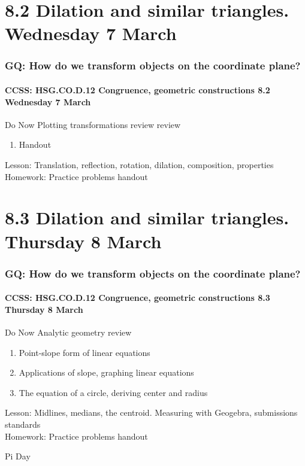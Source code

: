 \documentclass{beamer}
\begin{document}
\section{8.2 Dilation and similar triangles. Wednesday 7 March}
  \frame
  {
    \frametitle{GQ: How do we transform objects on the coordinate plane?}
    \framesubtitle{CCSS: HSG.CO.D.12 Congruence, geometric constructions \hfill \alert{8.2 Wednesday 7 March}}

    \begin{block}{Do Now Plotting transformations review review}
      \begin{enumerate}
        \item Handout
      \end{enumerate}
    \end{block}
    Lesson: Translation, reflection, rotation, dilation, composition, properties\\[0.5cm]
    Homework: Practice problems handout
  }

\section{8.3 Dilation and similar triangles. Thursday 8 March}
  \frame
  {
    \frametitle{GQ: How do we transform objects on the coordinate plane?}
    \framesubtitle{CCSS: HSG.CO.D.12 Congruence, geometric constructions \hfill \alert{8.3 Thursday 8 March}}

    \begin{block}{Do Now Analytic geometry review}
      \begin{enumerate}
        \item Point-slope form of linear equations
        \item Applications of slope, graphing linear equations
        \item The equation of a circle, deriving center and radius
      \end{enumerate}
    \end{block}
    Lesson: Midlines, medians, the centroid. Measuring with Geogebra, submissions standards\\[0.5cm]
    Homework: Practice problems handout
  }

  Pi Day
\end{document}

